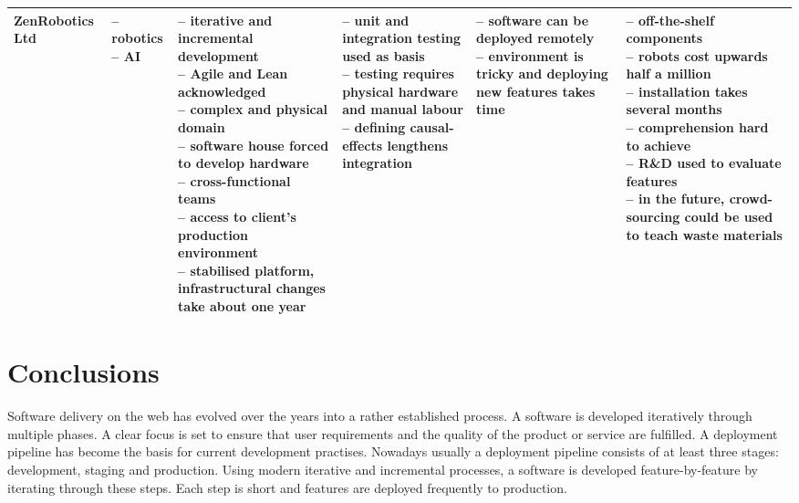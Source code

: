 \documentclass[english]{tktltiki2}
\begin{document}
\begin{landscape}
\begin{longtable}{|p{2.5cm}|p{1.5cm}|p{4cm}|p{4cm}|p{4cm}|p{4cm}|}
        ZenRobotics Ltd &
        \parbox[t]{1.5cm}{– robotics \\
                          – AI} &
        \parbox[t]{4cm}{– iterative and incremental development \\
                        – Agile and Lean acknowledged \\
                        – complex and physical domain \\
                        – software house forced to develop hardware \\
                        – cross-functional teams \\
                        – access to client’s production environment \\
                        – stabilised platform, infrastructural changes take about one year} &
        \parbox[t]{4cm}{– unit and integration testing used as basis \\
                        – testing requires physical hardware and manual labour \\
                        – defining causal-effects lengthens integration} &
        \parbox[t]{4cm}{– software can be deployed remotely \\
                        – environment is tricky and deploying new features takes time} &
        \parbox[t]{4cm}{– off-the-shelf components \\
                        – robots cost upwards half a million \\
                        – installation takes several months \\
                        – comprehension hard to achieve \\
                        – R\&D used to evaluate features \\
                        – in the future, crowd-sourcing could be used to teach waste materials} \\

        \hline

    \end{longtable}

\end{landscape}
\restoregeometry


\section{Conclusions}

Software delivery on the web has evolved over the years into a rather established process. A software is developed iteratively through multiple phases. A clear focus is set to ensure that user requirements and the quality of the product or service are fulfilled. A deployment pipeline has become the basis for current development practises. Nowadays usually a deployment pipeline consists of at least three stages: development, staging and production. Using modern iterative and incremental processes, a software is developed feature-by-feature by iterating through these steps. Each step is short and features are deployed frequently to production.
\end{document}
